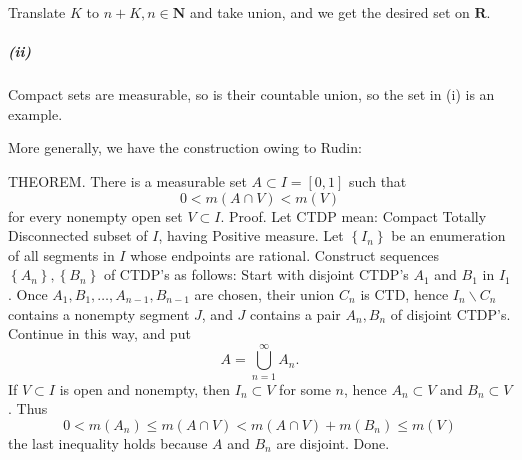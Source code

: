 \documentclass{article}
\begin{document}
Translate $K$ to $n+K, n\in\mathbf{N}$ and take union, and we get the desired set on $\mathbf{R}$.
\subparagraph{(ii)}
Compact sets are measurable, so is their countable union, so the set in (i) is an example.

More generally, we have the construction owing to Rudin:

THEOREM. There is a measurable set $A \subset I=[0,1]$ such that
$$
0<m(A \cap V)<m(V)
$$
for every nonempty open set $V \subset I$.
Proof. Let CTDP mean: Compact Totally Disconnected subset of $I$, having Positive measure. Let $\left\{I_{n}\right\}$ be an enumeration of all segments in $I$ whose endpoints are rational. Construct sequences $\left\{A_{n}\right\},\left\{B_{n}\right\}$ of CTDP's as follows:
Start with disjoint CTDP's $A_{1}$ and $B_{1}$ in $I_{1}$. Once $A_{1}, B_{1}, \ldots, A_{n-1}, B_{n-1}$ are chosen, their union $C_{n}$ is CTD, hence $I_{n} \backslash C_{n}$ contains a nonempty segment $J$, and $J$ contains a pair $A_{n}, B_{n}$ of disjoint CTDP's. Continue in this way, and put
$$
A=\bigcup_{n=1}^{\infty} A_{n} .
$$
If $V \subset I$ is open and nonempty, then $I_{n} \subset V$ for some $n$, hence $A_{n} \subset V$ and $B_{n} \subset V$. Thus
$$
0<m\left(A_{n}\right) \leq m(A \cap V)<m(A \cap V)+m\left(B_{n}\right) \leq m(V)
$$
the last inequality holds because $A$ and $B_{n}$ are disjoint. Done.
\end{document}
